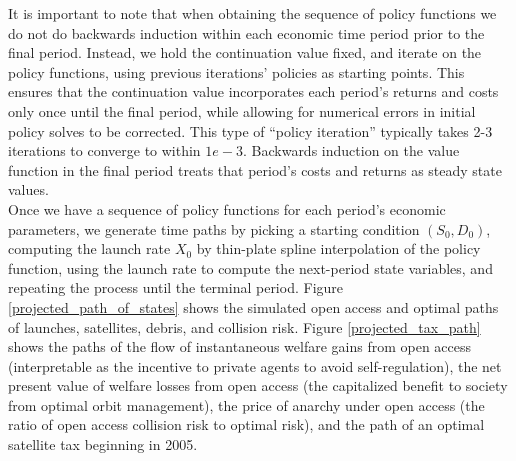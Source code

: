 \documentclass[12pt]{article}
\begin{document}
It is important to note that when obtaining the sequence of policy functions we do not do backwards induction within each economic time period prior to the final period. Instead, we hold the continuation value fixed, and iterate on the policy functions, using previous iterations' policies as starting points. This ensures that the continuation value incorporates each period's returns and costs only once until the final period, while allowing for numerical errors in initial policy solves to be corrected. This type of ``policy iteration'' typically takes 2-3 iterations to converge to within $1e-3$. Backwards induction on the value function in the final period treats that period's costs and returns as steady state values. \\

Once we have a sequence of policy functions for each period's economic parameters, we generate time paths by picking a starting condition $(S_0,D_0)$, computing the launch rate $X_0$ by thin-plate spline interpolation of the policy function, using the launch rate to compute the next-period state variables, and repeating the process until the terminal period. Figure \ref{projected_path_of_states} shows the simulated open access and optimal paths of launches, satellites, debris, and collision risk. Figure \ref{projected_tax_path} shows the paths of the flow of instantaneous welfare gains from open access (interpretable as the incentive to private agents to avoid self-regulation), the net present value of welfare losses from open access (the capitalized benefit to society from optimal orbit management), the price of anarchy under open access (the ratio of open access collision risk to optimal risk), and the path of an optimal satellite tax beginning in 2005.
\end{document}

